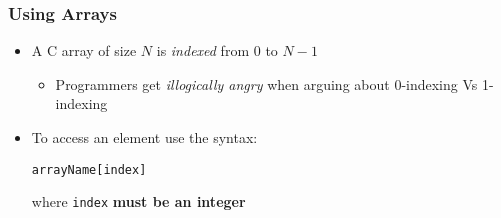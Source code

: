 \documentclass[14pt]{beamer}
\begin{document}
\begin{frame}[fragile]
\frametitle{Using Arrays}
\begin{itemize}
\item A C array of size $N$ is \textit{indexed} from $0$ to $N-1$
	\begin{itemize}
		\item Programmers get \textit{illogically angry} when arguing about 0-indexing Vs 1-indexing
	\end{itemize}
\item To access an element use the syntax:\\
\begin{lstlisting}[style=CStyle]
arrayName[index]
\end{lstlisting}
where \texttt{index} \textbf{must be an integer}
\end{itemize}
\end{frame}
\end{document}
